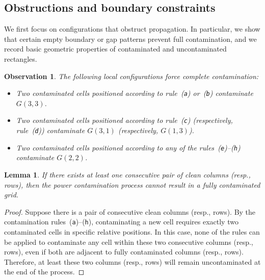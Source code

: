 \documentclass[letterpaper,12pt]{article}
\newtheorem{lemma}{Lemma}
\newtheorem{observation}{Observation}
\begin{document}
 

\subsection{Obstructions and boundary constraints}
We first focus on configurations that obstruct propagation. In particular, we show that certain empty boundary or gap patterns prevent full contamination, and we record basic geometric properties of contaminated and uncontaminated rectangles.



\begin{observation}\label{obse:observations}
The following local configurations force complete contamination:\begin{itemize}

    \item[\textup{(A)}]  Two contaminated cells positioned according to rule~\textup{(\texttt{a})} or~\textup{(\texttt{b})} contaminate \(G(3,3)\).\label{item:remarkonG33}
    \item[\textup{(B)}]  Two contaminated cells positioned according to rule~\textup{(\texttt{c})} (respectively, rule~\textup{(\texttt{d})})   contaminate  \(G(3,1)\) (respectively, \(G(1,3)\)).
    \item[\textup{(C)}]  Two contaminated cells positioned according to any of the rules~\textup{(\texttt{e})}--\textup{(\texttt{h})}   contaminate  \(G(2,2)\).
\end{itemize}
\end{observation}

 



\begin{lemma}\label{lem:no-two-empty}
If there exists at least one consecutive pair of clean columns (resp., rows), then the power contamination process cannot result in a fully contaminated grid.
\end{lemma}

\begin{proof}
Suppose there is a pair of consecutive clean columns (resp., rows). By the contamination rules~\textup{(\texttt{a})}--\textup{(\texttt{h})}, contaminating a new cell requires exactly two contaminated cells in specific relative positions. In this case, none of the rules can be applied to contaminate any cell within these two consecutive columns (resp., rows), even if both are adjacent to fully contaminated columns (resp., rows). Therefore, at least these two columns (resp., rows) will remain uncontaminated at the end of the process.\qedhere
\end{proof}
\end{document}
